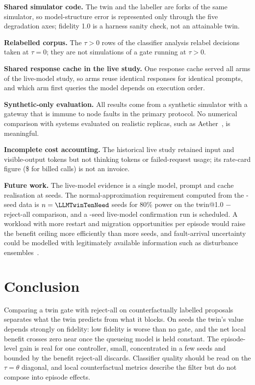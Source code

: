 \documentclass[conference]{IEEEtran}
\begin{document}
\textbf{Shared simulator code.} The twin and the labeller are forks of the same simulator, so model-structure error is represented only through the five degradation axes; fidelity 1.0 is a harness sanity check, not an attainable twin.

\textbf{Relabelled corpus.} The $\tau>0$ rows of the classifier analysis relabel decisions taken at $\tau=0$; they are not simulations of a gate running at $\tau>0$.

\textbf{Shared response cache in the live study.} One response cache served all arms of the live-model study, so arms reuse identical responses for identical prompts, and which arm first queries the model depends on execution order.

\textbf{Synthetic-only evaluation.} All results come from a synthetic simulator with a gateway that is immune to node faults in the primary protocol. No numerical comparison with systems evaluated on realistic replicas, such as Aether~\cite{aether}, is meaningful.

\textbf{Incomplete cost accounting.} The historical live study retained input and visible-output tokens but not thinking tokens or failed-request usage; its rate-card figure (\$\LLMRateCardCost{} for \LLMBilledCalls{} billed calls) is not an invoice.

\textbf{Future work.} The live-model evidence is a single model, prompt and cache realisation at \LLMSeeds{} seeds. The normal-approximation requirement computed from the \LLMSeeds-seed data is $n=\LLMTwinTenNeed$ seeds for 80\% power on the twin@1.0 $-$ reject-all comparison, and a \LLMTwinTenNeed-seed live-model confirmation run is scheduled. A workload with more restart and migration opportunities per episode would raise the benefit ceiling more efficiently than more seeds, and fault-arrival uncertainty could be modelled with legitimately available information such as disturbance ensembles~\cite{robustmps,pomcp}.

\section{Conclusion}
Comparing a twin gate with reject-all on counterfactually labelled proposals separates what the twin predicts from what it blocks. On \NSeeds{} seeds the twin's value depends strongly on fidelity: low fidelity is worse than no gate, and the net local benefit crosses zero near \ScrCrossII{} once the queueing model is held constant. The episode-level gain is real for one controller, small, concentrated in a few seeds and bounded by the benefit reject-all discards. Classifier quality should be read on the $\tau=\theta$ diagonal, and local counterfactual metrics describe the filter but do not compose into episode effects.
\end{document}
